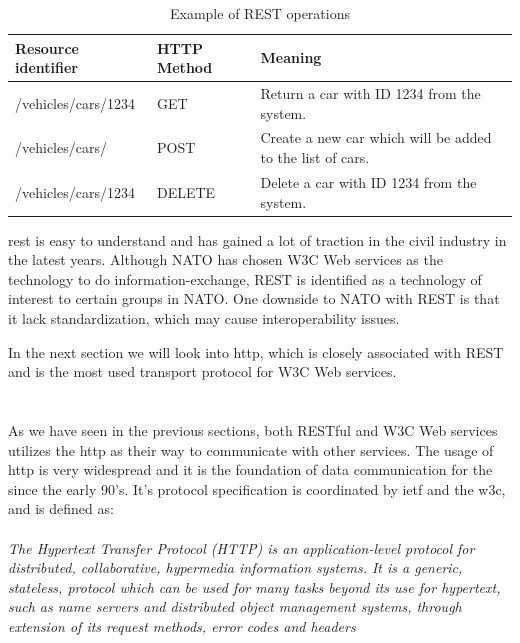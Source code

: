  \begin{table}[h]
 \begin{tabularx}{\textwidth}{| X | X | X |}
 \hline
   \textbf{Resource identifier} & \textbf{HTTP Method}  & \textbf{Meaning}\\ \hline
   /vehicles/cars/1234 & GET & Return a car with ID 1234 from the system. \\ \hline
   /vehicles/cars/ & POST & Create a new car which will be added to the list of cars. \\ \hline
   /vehicles/cars/1234 & DELETE & Delete a car with ID 1234 from the system. \\ \hline
 \end{tabularx}
 \caption{Example of REST operations}
 \label{table-rest}
 \end{table}

 \gls{rest} is easy to understand and has gained a lot of traction in the civil
 industry in the latest years. Although NATO has chosen W3C Web services as the
 technology to do information-exchange, REST is identified as a technology of
 interest to certain groups in
 NATO\cite{johnsen-bloebaum-recommendations-web-services-tactical-domain}. One
 downside to NATO with REST is that it lack standardization, which may cause
 interoperability issues.

 In the next section we will look into \gls{http}, which is closely associated
 with REST and is the most used transport protocol for W3C Web services.

\section{}

As we have seen in the previous sections, both RESTful and W3C Web services
utilizes the \gls{http} as their way to communicate with other services. The
usage of \gls{http} is very widespread and it is the foundation of data
communication for the  since the early 90's. It's protocol
specification is coordinated by \gls{ietf} and the \gls{w3c}, and is defined
as\cite{rfc-2616}:

\paragraph{}
\textit{
    The Hypertext Transfer Protocol (HTTP) is an application-level
    protocol for distributed, collaborative, hypermedia information
    systems. It is a generic, stateless, protocol which can be used for
    many tasks beyond its use for hypertext, such as name servers and
    distributed object management systems, through extension of its
    request methods, error codes and headers
}

